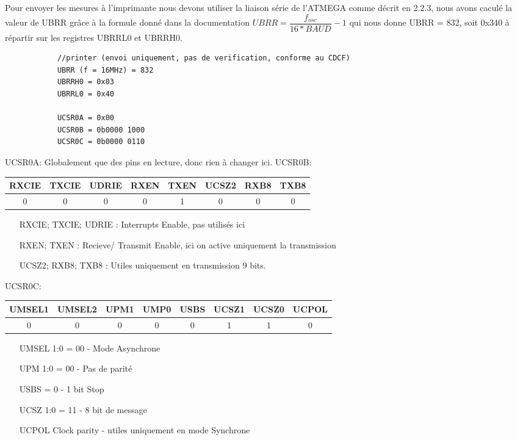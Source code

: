\documentclass[a4paper, 12pt]{article}
\begin{document}
		Pour envoyer les mesures à l'imprimante nous devons utiliser la liaison série de l'ATMEGA comme décrit en 2.2.3, nous avons caculé la valeur de UBRR grâce à la formule donné dans la documentation $UBRR = \dfrac{f_{osc}}{16*BAUD} - 1$ qui nous donne UBRR = 832, soit 0x340 à répartir sur les registres UBRRL0 et UBRRH0.
		\begin{lstlisting}
			//printer (envoi uniquement, pas de verification, conforme au CDCF)
			UBRR (f = 16MHz) = 832
			UBRRH0 = 0x03
			UBRRL0 = 0x40
			
			UCSR0A = 0x00
			UCSR0B = 0b0000 1000
			UCSR0C = 0b0000 0110			
		\end{lstlisting}
		UCSR0A:
			Globalement que des pins en lecture, donc rien à changer ici.	
		UCSR0B:
		\begin{center}
			\begin{tabular}{|c|c|c|c|c|c|c|c|}
				\hline
				RXCIE & TXCIE & UDRIE & RXEN & TXEN & UCSZ2 & RXB8 & TXB8\\
				\hline
				0 & 0 & 0 & 0 & 1 & 0 & 0 & 0\\
				\hline
			\end{tabular}
		\end{center}
		\begin{itemize}
			\item[RXCIE; TXCIE; UDRIE] : Interrupts Enable, pas utilisés ici
			\item[RXEN; TXEN] : Recieve/ Transmit Enable, ici on active uniquement la transmission
			\item[UCSZ2; RXB8; TXB8] : Utiles uniquement en transmission 9 bits.
		\end{itemize}

		UCSR0C:
		\begin{center}
			\begin{tabular}{|c|c|c|c|c|c|c|c|}
				\hline
				UMSEL1 & UMSEL2 & UPM1 & UMP0 & USBS & UCSZ1 & UCSZ0 & UCPOL\\
				\hline
				0 & 0 & 0 & 0 & 0 & 1 & 1 & 0\\
				\hline
			\end{tabular}
		\end{center}
		\begin{itemize}
			\item[UMSEL 1:0] = 00 - Mode Asynchrone
			\item[UPM 1:0] = 00 - Pas de parité
			\item[USBS] = 0 - 1 bit Stop
			\item[UCSZ 1:0] = 11 - 8 bit de message
			\item[UCPOL] Clock parity - utiles uniquement en mode Synchrone
		\end{itemize}
	
\end{document}
